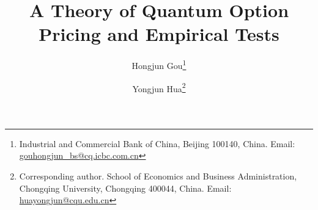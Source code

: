 \documentclass[12pt,a4paper]{article}
\title{A Theory of Quantum Option Pricing and Empirical Tests}
\author{%
  Hongjun Gou\thanks{Industrial and Commercial Bank of China,
    Beijing 100140, China.
    Email: \href{mailto:gouhongjun_bs@cq.icbc.com.cn}{gouhongjun\_bs@cq.icbc.com.cn}}
  \and
  Yongjun Hua\thanks{Corresponding author. School of Economics and Business
    Administration, Chongqing University, Chongqing 400044, China.
    Email: \href{mailto:huayongjun@cqu.edu.cn}{huayongjun@cqu.edu.cn}}%
}
\date{}
\theoremstyle{plain}
\theoremstyle{definition}
\begin{document}
\maketitle










\FloatBarrier







\FloatBarrier  %



\end{document}
